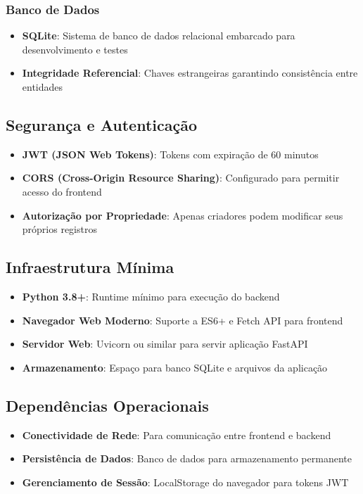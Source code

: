 \documentclass[12pt,a4paper]{article}
\begin{document}
\subsubsection{Banco de Dados}
\begin{itemize}
    \item \textbf{SQLite}: Sistema de banco de dados relacional embarcado para desenvolvimento e testes
    \item \textbf{Integridade Referencial}: Chaves estrangeiras garantindo consistência entre entidades
\end{itemize}

\subsection{Segurança e Autenticação}
\begin{itemize}
    \item \textbf{JWT (JSON Web Tokens)}: Tokens com expiração de 60 minutos
    \item \textbf{CORS (Cross-Origin Resource Sharing)}: Configurado para permitir acesso do frontend
    \item \textbf{Autorização por Propriedade}: Apenas criadores podem modificar seus próprios registros
\end{itemize}

\subsection{Infraestrutura Mínima}
\begin{itemize}
    \item \textbf{Python 3.8+}: Runtime mínimo para execução do backend
    \item \textbf{Navegador Web Moderno}: Suporte a ES6+ e Fetch API para frontend
    \item \textbf{Servidor Web}: Uvicorn ou similar para servir aplicação FastAPI
    \item \textbf{Armazenamento}: Espaço para banco SQLite e arquivos da aplicação
\end{itemize}

\subsection{Dependências Operacionais}
\begin{itemize}
    \item \textbf{Conectividade de Rede}: Para comunicação entre frontend e backend
    \item \textbf{Persistência de Dados}: Banco de dados para armazenamento permanente
    \item \textbf{Gerenciamento de Sessão}: LocalStorage do navegador para tokens JWT
\end{itemize}
\end{document}
